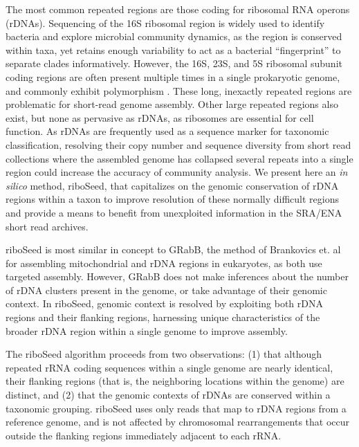 \documentclass[10pt]{article}
\begin{document}
\begin{linenumbers}
The most common repeated regions are those coding for ribosomal RNA operons (rDNAs). Sequencing of the 16S ribosomal region is widely used to identify bacteria and explore microbial community dynamics\cite{Weisburg1991,Clarridge2004,Woese1990,Case2007}, as the region is conserved within taxa, yet retains enough variability to act as a bacterial ``fingerprint'' to separate clades informatively. However, the 16S, 23S, and 5S ribosomal subunit coding regions are often present multiple times in a single prokaryotic genome, and commonly exhibit polymorphism \cite{Coenye2003,Moreno2002,Lukjancenko2010,Vetrovsky2013}. These long, inexactly repeated regions\cite{Alkan2011} are problematic for short-read genome assembly. Other large repeated regions also exist, but none as pervasive as rDNAs, as ribosomes are essential for cell function. As rDNAs are frequently used as a sequence marker for taxonomic classification, resolving their copy number and sequence diversity from short read collections where the assembled genome has collapsed several repeats into a single region could increase the accuracy of community analysis. We present here an \textit{in silico} method, riboSeed, that capitalizes on the genomic conservation of rDNA regions within a taxon to improve resolution of these normally difficult regions and provide a means to benefit from unexploited information in the SRA/ENA short read archives.


riboSeed is most similar in concept to GRabB, the method of Brankovics et. al \cite{Brankovics2016} for assembling mitochondrial and rDNA regions in eukaryotes, as both use targeted assembly. However, GRabB does not make inferences about the number of rDNA clusters present in the genome, or take advantage of their genomic context. In riboSeed, genomic context is resolved by exploiting both rDNA regions and their flanking regions, harnessing unique characteristics of the broader rDNA region within a single genome to improve assembly.


The riboSeed algorithm proceeds from two observations: (1) that although repeated rRNA coding sequences within a single genome are nearly identical, their flanking regions (that is, the neighboring locations within the genome) are distinct, and (2) that the genomic contexts of rDNAs are conserved within a taxonomic grouping. riboSeed uses only reads that map to rDNA regions from a reference genome, and is not affected by chromosomal rearrangements that occur outside the flanking regions immediately adjacent to each rRNA.



\end{linenumbers}
\end{document}

